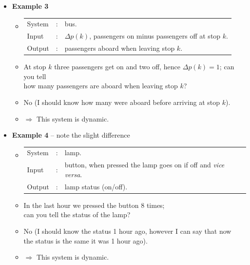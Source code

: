 \begin{frame}
\myPause
 \begin{itemize}[<+-| alert@+>]
 \item \textbf{Example 3}
       \begin{itemize}[<+-| alert@+>]
       \item[] \begin{tabular}{lll}
                System  &: & bus.\\
                Input   &: & $\Delta p(k)$, passengers on minus passengers off at stop $k$.\\
                Output  &: & passengers aboard when leaving stop $k$.
               \end{tabular}
       \item \vspace{1mm}At stop $k$ three passengers get on and two off, hence $\Delta p(k)=1$; can you tell\\
             how many passengers are aboard when leaving stop $k$?
       \item No (I should know how many were aboard before arriving at stop $k$).
       \item[] $\Rightarrow$ This system is dynamic. 
       \end{itemize}
 \end{itemize}
\end{frame}

\begin{frame}
\myPause
 \begin{itemize}[<+-| alert@+>]
 \item \textbf{Example 4} -- note the slight difference
       \begin{itemize}[<+-| alert@+>]
       \item[] \begin{tabular}{lll}
                System  &: & lamp.\\
                Input   &: & button, when pressed the lamp goes on if off and \emph{vice versa}.\\
                Output  &: & lamp status (on/off).
               \end{tabular}
       \item \vspace{1mm}In the last hour we pressed the button 8 times;\\
             can you tell the status of the lamp?
       \item No (I should know the status 1 hour ago, however I can say that now\\
             the status is the same it was 1 hour ago).
       \item[] $\Rightarrow$ This system is dynamic. 
       \end{itemize}
 \end{itemize}
\end{frame}

